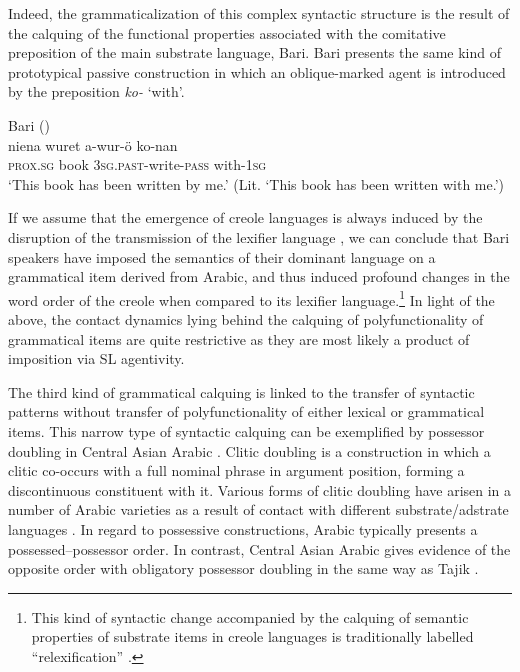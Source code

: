 \documentclass[output=paper]{langsci/langscibook}
\begin{document}
Indeed, the grammaticalization of this complex syntactic structure is the result of the calquing of the functional properties associated with the comitative preposition of the main substrate language, Bari. Bari presents the same kind of prototypical passive construction in which an oblique-marked agent is introduced by the preposition \textit{ko-} ‘with’.

\ea\label{ex:key:}

{Bari (\citealt[65]{Owen1909})}\\
\gll   niena  wuret   a-wur-ö ko-nan \\
       \textsc{prox.sg} book \textsc{3sg.past}-write-\textsc{pass} with-\textsc{1sg}\\
\glt   `This book has been written by me.' (Lit. ‘This book has been written with me.’)
\z

If we assume that the emergence of creole languages is always induced by the disruption of the transmission of the lexifier language \citep{Comrie2011}, we can conclude that Bari speakers have imposed the semantics of their dominant language on a grammatical item derived from Arabic, and thus induced profound changes in the word order of the creole when compared to its lexifier language.\footnote{This kind of syntactic change accompanied by the calquing of semantic properties of substrate items in creole languages is traditionally labelled ``relexification'' \citep{Lefebvre1998}.}  In light of the above, the contact dynamics lying behind the calquing of polyfunctionality of grammatical items are quite restrictive as they are most likely a product of imposition via SL agentivity.  

The third kind of grammatical calquing is linked to the transfer of syntactic patterns without transfer of polyfunctionality of either lexical or grammatical items. This narrow type of syntactic calquing can be exemplified by possessor doubling in Central Asian Arabic \citep{Ratcliffe2005}. Clitic doubling is a construction in which a clitic co-occurs with a full nominal phrase in argument position, forming a discontinuous constituent with it. Various forms of clitic doubling have arisen in a number of Arabic varieties as a result of contact with different substrate/adstrate languages \citep{Souag2017clitic}. In regard to possessive constructions, Arabic typically presents a possessed–possessor order. In contrast, Central Asian Arabic  gives evidence of the opposite order with obligatory possessor doubling in the same way as Tajik . 
\end{document}
